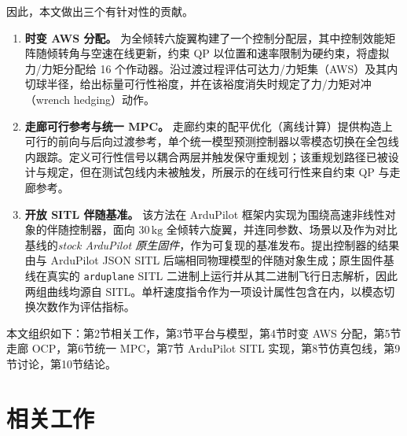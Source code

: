 \documentclass[UTF8,a4paper,11pt]{ctexart}
\newcommand{\SI}[2]{\ensuremath{#1\,#2}}
\newcommand{\kilogram}{\mathrm{kg}}
\begin{document}
因此，本文做出三个有针对性的贡献。

\begin{enumerate}[label=(\roman*),leftmargin=2.2em]
  \item \textbf{时变 AWS 分配。} 为全倾转六旋翼构建了一个控制分配层，其中控制效能矩阵随倾转角与空速在线更新，约束 QP 以位置和速率限制为硬约束，将虚拟力/力矩分配给 16 个作动器。沿过渡过程评估可达力/力矩集（AWS）及其内切球半径，给出标量可行性裕度，并在该裕度消失时规定了力/力矩对冲（wrench hedging）动作。
  \item \textbf{走廊可行参考与统一 MPC。} 走廊约束的配平优化（离线计算）提供构造上可行的前向与后向过渡参考，单个统一模型预测控制器以零模态切换在全包线内跟踪。定义可行性信号以耦合两层并触发保守重规划；该重规划路径已被设计与规定，但在测试包线内未被触发，所展示的在线可行性来自约束 QP 与走廊参考。
  \item \textbf{开放 SITL 伴随基准。} 该方法在 ArduPilot 框架内实现为围绕高速非线性对象的伴随控制器，面向 \SI{30}{\kilogram} 全倾转六旋翼，并连同参数、场景以及作为对比基线的\emph{stock ArduPilot 原生固件}，作为可复现的基准发布。提出控制器的结果由与 ArduPilot JSON SITL 后端相同物理模型的伴随对象生成；原生固件基线在真实的 \texttt{arduplane} SITL 二进制上运行并从其二进制飞行日志解析，因此两组曲线均源自 SITL。单杆速度指令作为一项设计属性包含在内，以模态切换次数作为评估指标。
\end{enumerate}

本文组织如下：第2节相关工作，第3节平台与模型，第4节时变 AWS 分配，第5节走廊 OCP，第6节统一 MPC，第7节 ArduPilot SITL 实现，第8节仿真包线，第9节讨论，第10节结论。

\section{相关工作}\label{sec:related}
\end{document}
